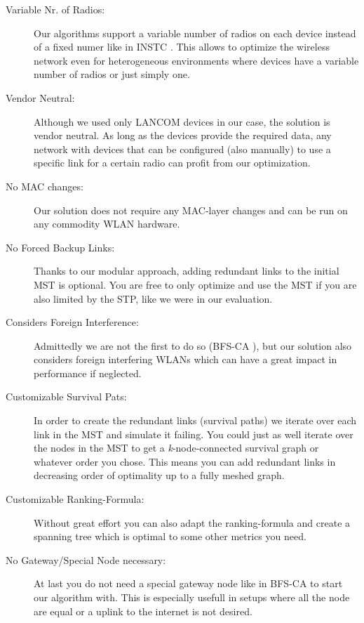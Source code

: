       \begin{description}
	\item [Variable Nr. of Radios:] Our algorithms support a variable number of radios on each device instead of a fixed numer like in \ac{INSTC} \cite{INSTC}. 
	  This allows to optimize the wireless network even for heterogeneous environments where devices have a variable number of radios or just simply one.
	\item [Vendor Neutral:] Although we used only LANCOM devices in our case, the solution is vendor neutral. As long as the devices provide the required data,
	  any network with devices that can be configured (also manually) to use a specific link for a certain radio can profit from our optimization.
	\item [No MAC changes:] Our solution does not require any \ac{MAC}-layer changes and can be run on any commodity \ac{WLAN} hardware.
	\item [No Forced Backup Links:] Thanks to our modular approach, adding redundant links to the initial \ac{MST} is optional. 
	  You are free to only optimize and use the \ac{MST} if you are also limited by the \ac{STP}, like we were in our evaluation.
	\item [Considers Foreign Interference:] Admittedly we are not the first to do so (\ac{BFS-CA} \cite{BFS-CA}), but our solution also 
	  considers foreign interfering WLANs which can have a great impact in performance if neglected.
	\item [Customizable Survival Pats:] In order to create the redundant links (survival paths) we iterate over each link in the \ac{MST} and simulate it failing.
	  You could just as well iterate over the nodes in the \ac{MST} to get a \textit{k}-node-connected survival graph or whatever order you chose.
	  This means you can add redundant links in decreasing order of optimality up to a fully meshed graph.
	\item [Customizable Ranking-Formula:] Without great effort you can also adapt the ranking-formula and create a spanning tree which is optimal to some other metrics you need.
	\item [No Gateway/Special Node necessary:] At last you do not need a special gateway node like in \ac{BFS-CA} \cite{BFS-CA} to start our algorithm with.
	  This is especially usefull in setups where all the node are equal or a uplink to the internet is not desired.
      \end{description}